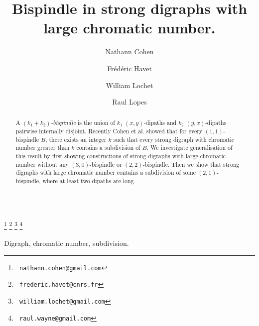 \documentclass{endm}
\begin{document}
\begin{verbatim}\end{verbatim}\vspace{2.5cm}

\begin{frontmatter}

\title{Bispindle in strong digraphs with large chromatic number.}

\author{Nathann Cohen}
\address{CNRS, LRI, Univ. Paris Sud, Orsay, France}

\author{Fr\'ed\'eric Havet}
\address{ Univ. C\^ote d'Azur, CNRS, I3S, INRIA, France}


\author{William Lochet}
\address{ Univ. C\^ote d'Azur, CNRS, I3S, INRIA, LIP, ENS Lyon, France}

\author{Raul Lopes}
\address{Departamento de Computa\c{c}ao, Universidade Federal do Cear\'a, Fortaleza, Brazil}



   \thanks[mail1]{\texttt{\normalshape
  nathann.cohen@gmail.com}} 
  \thanks[mail2]{\texttt{\normalshape
  frederic.havet@cnrs.fr}} 
  \thanks[mail3]{\texttt{\normalshape
  william.lochet@gmail.com}}
  \thanks[mail4]{\texttt{\normalshape
  raul.wayne@gmail.com}}


\begin{abstract}
A {\it $(k_1+k_2)$-bispindle} is the union of $k_1$  $(x,y)$-dipaths and $k_2$ $(y,x)$-dipaths pairwise internally disjoint.
Recently Cohen et al. showed that for every $(1,1)$- bispindle $B$, there exists an integer $k$ such that every strong
digraph with chromatic number greater than $k$ contains a subdivision of $B$. We investigate generalisation of
this result by first showing constructions of strong digraphs with large chromatic number without any $(3,0)$-bispindle
or $(2,2)$-bispindle. Then we show that strong digraphs with large chromatic number contains a subdivision of some 
$(2,1)$-bispindle, where at least two dipaths are long.    
\end{abstract}

\begin{keyword}
Digraph, chromatic number, subdivision.
\end{keyword}

\end{frontmatter}
\end{document}
